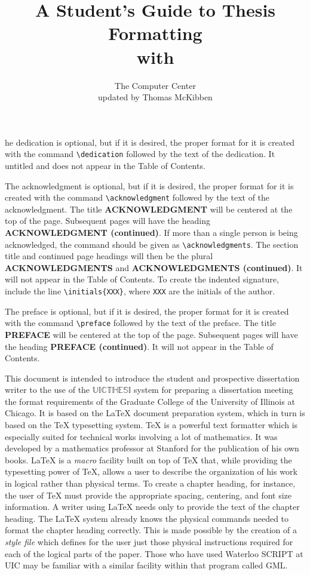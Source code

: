 \documentclass{uicthesi}
\title{A Student's Guide to Thesis Formatting \\with \uicthesi{}}
\author{The Computer Center\\updated by Thomas McKibben}
\newcommand{\uicthesi}{{$\mathbb{UICTHESI}$}}
\begin{document}
\maketitle
\copyrightpage
\dedication
The dedication is optional, but if it is desired, the proper format for
it is created with the command \verb+\dedication+ followed by the
text of the dedication.
It untitled and does not appear in the Table of Contents.
 
\acknowledgment
The acknowledgment is optional, but if it is desired, the
proper format for it is created with the command \verb+\acknowledgment+
followed by the text of the acknowledgment.
The title {\bf ACKNOWLEDGMENT} will be centered at the top of the page.
Subsequent pages will have the heading {\bf ACKNOWLEDGMENT (continued)}.
If more than a single person is being acknowledged, the command should
be given as \verb+\acknowledgments+.  The section title and continued
page headings will then be the plural {\bf ACKNOWLEDGMENTS} and
{\bf ACKNOWLEDGMENTS (continued)}.
It will not appear in the Table of Contents.
To create the indented signature, include the line
\verb+\initials{XXX}+, where \verb+XXX+ are the initials of the author.
 
\preface
The preface is optional, but if it is desired, the
proper format for it is created with the command \verb+\preface+
followed by the text of the preface.
The title {\bf PREFACE} will be centered at the top of the page.
Subsequent pages will have the heading {\bf PREFACE (continued)}.
It will not appear in the Table of Contents.
 
 
This document is intended to introduce the student and prospective
dissertation writer to the use of the \uicthesi{} system
for preparing a dissertation meeting the format requirements
of the Graduate College of the University of Illinois at Chicago.
It is based on the \LaTeX{} document preparation system, which in turn
is based on the \TeX{} typesetting system.
\TeX{} is a powerful text formatter which is especially suited for
technical works involving a lot of mathematics. It was developed
by a mathematics professor at Stanford for the publication of his
own books.
\LaTeX{} is a {\em macro} facility built on top of \TeX{} that,
while providing the typesetting power of \TeX{}, allows a user to
describe the organization of his work in logical rather than
physical terms.
To create a chapter heading, for instance, the user of \TeX{} must
provide the appropriate spacing, centering, and font size information.
A writer using \LaTeX{}
needs only to provide the text of the chapter heading.
The \LaTeX{} system already knows the physical commands needed to
format the chapter heading correctly.
This is made possible by the creation of a {\em style file} which
defines for the user just those physical instructions required for each
of the logical parts of the paper.
Those who have used Waterloo SCRIPT at UIC may be familiar with
a similar facility within that program called GML.
 
\end{document}
